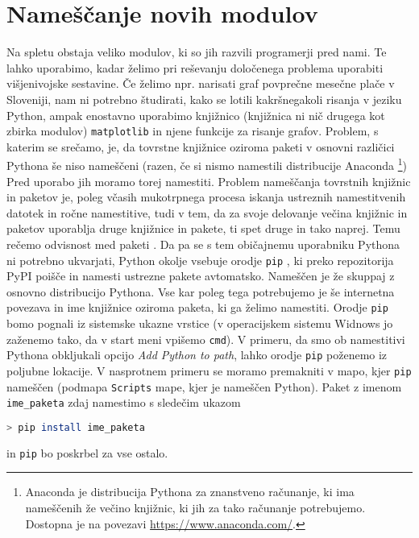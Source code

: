 \section{Nameščanje novih modulov}
Na spletu obstaja veliko modulov, ki so jih razvili programerji pred nami. Te lahko uporabimo, kadar želimo pri reševanju določenega problema uporabiti višjenivojske sestavine. Če želimo npr. narisati graf povprečne mesečne plače v Sloveniji, nam ni potrebno študirati, kako se lotili kakršnegakoli risanja v jeziku Python, ampak enostavno uporabimo knjižnico (knjižnica ni nič drugega kot zbirka modulov) \texttt{matplotlib} in njene funkcije za risanje grafov. Problem, s katerim se srečamo, je, da tovrstne knjižnice oziroma paketi v osnovni različici Pythona še niso nameščeni (razen, če si nismo namestili distribucije Anaconda \footnote{Anaconda je distribucija Pythona za znanstveno računanje, ki ima nameščenih že večino knjižnic, ki jih za tako računanje potrebujemo. Dostopna je na povezavi \url{https://www.anaconda.com/}.}) Pred uporabo jih moramo torej namestiti. Problem nameščanja tovrstnih knjižnic in paketov je, poleg včasih mukotrpnega procesa iskanja ustreznih namestitvenih datotek in ročne namestitive, tudi v tem, da za svoje delovanje večina knjižnic in paketov uporablja druge knjižnice in pakete, ti spet druge in tako naprej. Temu rečemo odvisnost med paketi . Da pa se s tem običajnemu uporabniku Pythona ni potrebno ukvarjati, Python okolje vsebuje orodje \texttt{pip} , ki preko repozitorija PyPI  poišče in namesti ustrezne pakete avtomatsko. Nameščen je že skuppaj z osnovno distribucijo Pythona. Vse kar poleg tega potrebujemo je še internetna povezava in ime knjižnice oziroma paketa, ki ga želimo namestiti. Orodje \texttt{pip} bomo pognali iz sistemske ukazne vrstice (v operacijskem sistemu Widnows jo zaženemo tako, da v start meni vpišemo \texttt{cmd}). V primeru, da smo ob namestitivi Pythona obkljukali opcijo \emph{Add Python to path}, lahko orodje \texttt{pip} poženemo iz poljubne lokacije. V nasprotnem primeru se moramo premakniti v mapo, kjer \texttt{pip} nameščen (podmapa \texttt{Scripts} mape, kjer je nameščen Python). Paket z imenom \texttt{ime\_paketa}  zdaj namestimo s sledečim ukazom
\begin{lstlisting}[language=bash]
> pip install ime_paketa
\end{lstlisting}
in \texttt{pip} bo poskrbel za vse ostalo.







